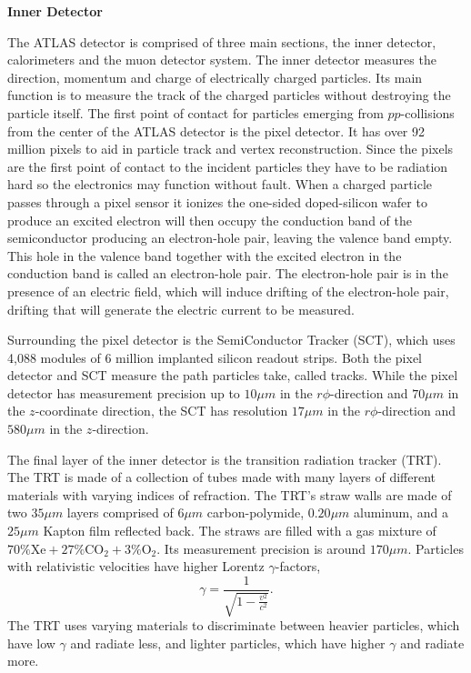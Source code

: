 \noindent\textbf{Inner Detector}

The ATLAS detector is comprised of three main sections, the inner detector, calorimeters and the muon detector system. 
The inner detector measures the direction, momentum and charge of electrically charged particles.
Its main function is to measure the track of the charged particles without destroying the particle itself.
The first point of contact for particles emerging from $pp$-collisions from the center of the ATLAS detector is the pixel detector.\cite{PixelDetector_2008}
It has over 92 million pixels to aid in particle track and vertex reconstruction.
Since the pixels are the first point of contact to the incident particles they have to be radiation hard so the electronics may function without fault.
When a charged particle passes through a pixel sensor it ionizes the one-sided doped-silicon wafer to produce an excited electron will then occupy the conduction band of the semiconductor producing an electron-hole pair, leaving the valence band empty.\cite{KnollRadDetection}
This hole in the valence band together with the excited electron in the conduction band is called an electron-hole pair.
The electron-hole pair is in the presence of an electric field, which will induce drifting of the electron-hole pair, drifting that will generate the electric current to be measured.

Surrounding the pixel detector is the SemiConductor Tracker (SCT), which uses 4,088 modules of 6 million implanted silicon readout strips.\cite{ABDESSELAM2006642}
Both the pixel detector and SCT measure the path particles take, called tracks.
While the pixel detector has measurement precision up to $10 \mu m$ in the $r\phi$-direction and $70 \mu m$ in the $z$-coordinate direction,\cite{Andreazza:1287089} the SCT has resolution $17 \mu m$ in the $r\phi$-direction and $580 \mu m$ in the $z$-direction. 

The final layer of the inner detector is the transition radiation tracker (TRT). 
The TRT is made of a collection of tubes made with many layers of different materials with varying indices of refraction.
The TRT's straw walls are made of two $35\mu m$ layers comprised of $6\mu m$ carbon-polymide, $0.20 \mu m$ aluminum, and a $25\mu m$ Kapton film reflected back.\cite{TRT_2008}
The straws are filled with a gas mixture of $70\% \text{Xe} + 27\% \text{CO}_2 + 3\% \text{O}_2$. 
Its measurement precision is around $170 \mu m$. 
Particles with relativistic velocities have higher Lorentz $\gamma$-factors,
\begin{equation}\label{lorentzGamma}
    \gamma = \frac{1}{\sqrt{1 - \frac{v^2}{c^2}}}.
\end{equation}
The TRT uses varying materials to discriminate between heavier particles, which have low $\gamma$ and radiate less, and lighter particles, which have higher $\gamma$ and radiate more.\cite{Mindur:2139567}


